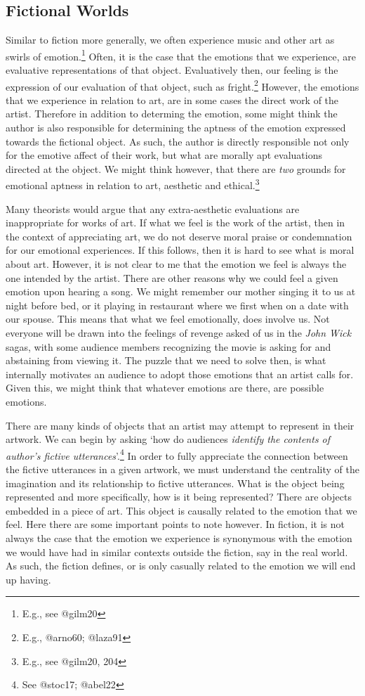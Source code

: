 \documentclass[
  letterpaper,
  DIV=11,
  numbers=noendperiod]{scrartcl}
\theoremstyle{remark}
\begin{document}
\subsection{Fictional Worlds}\label{fictional-worlds}

Similar to fiction more generally, we often experience music and other
art as swirls of emotion.\footnote{E.g., see @gilm20} Often, it is the
case that the emotions that we experience, are evaluative
representations of that object. Evaluatively then, our feeling is the
expression of our evaluation of that object, such as fright.\footnote{E.g.,
  @arno60; @laza91} However, the emotions that we experience in relation
to art, are in some cases the direct work of the artist. Therefore in
addition to determing the emotion, some might think the author is also
responsible for determining the aptness of the emotion expressed towards
the fictional object. As such, the author is directly responsible not
only for the emotive affect of their work, but what are morally apt
evaluations directed at the object. We might think however, that there
are \emph{two} grounds for emotional aptness in relation to art,
aesthetic and ethical.\footnote{E.g., see @gilm20, 204}

Many theorists would argue that any extra-aesthetic evaluations are
inappropriate for works of art. If what we feel is the work of the
artist, then in the context of appreciating art, we do not deserve moral
praise or condemnation for our emotional experiences. If this follows,
then it is hard to see what is moral about art. However, it is not clear
to me that the emotion we feel is always the one intended by the artist.
There are other reasons why we could feel a given emotion upon hearing a
song. We might remember our mother singing it to us at night before bed,
or it playing in restaurant where we first when on a date with our
spouse. This means that what we feel emotionally, does involve us. Not
everyone will be drawn into the feelings of revenge asked of us in the
\emph{John Wick} sagas, with some audience members recognizing the movie
is asking for and abstaining from viewing it. The puzzle that we need to
solve then, is what internally motivates an audience to adopt those
emotions that an artist calls for. Given this, we might think that
whatever emotions are there, are possible emotions.

There are many kinds of objects that an artist may attempt to represent
in their artwork. We can begin by asking `how do audiences
\emph{identify the contents of author's fictive utterances}'.\footnote{See
  @stoc17; @abel22} In order to fully appreciate the connection between
the fictive utterances in a given artwork, we must understand the
centrality of the imagination and its relationship to fictive
utterances. What is the object being represented and more specifically,
how is it being represented? There are objects embedded in a piece of
art. This object is causally related to the emotion that we feel. Here
there are some important points to note however. In fiction, it is not
always the case that the emotion we experience is synonymous with the
emotion we would have had in similar contexts outside the fiction, say
in the real world. As such, the fiction defines, or is only casually
related to the emotion we will end up having.
\end{document}

